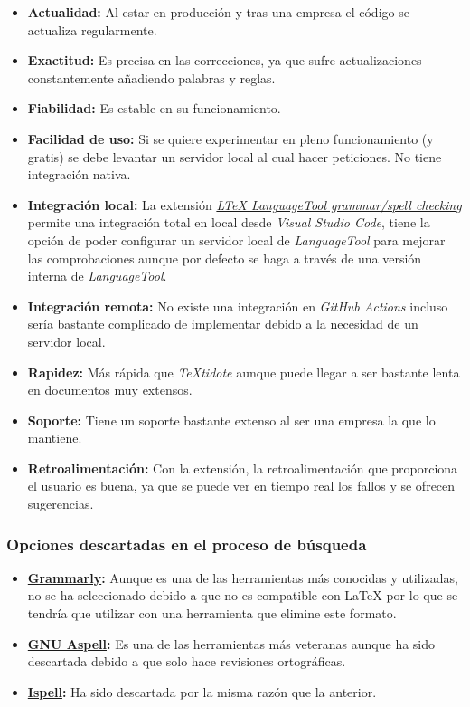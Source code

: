 \begin{itemize}
    \item[\bien] \textbf{Actualidad:}  Al estar en producción y tras una empresa el código se actualiza regularmente.
    \item[\bien] \textbf{Exactitud:} Es precisa en las correcciones, ya que sufre actualizaciones constantemente añadiendo palabras y reglas.
    \item[\bien] \textbf{Fiabilidad:} Es estable en su funcionamiento.
    \item[\regular] \textbf{Facilidad de uso:} Si se quiere experimentar en pleno funcionamiento (y gratis) se debe levantar un servidor local al cual hacer peticiones. No tiene integración nativa.
    \item[\esp] \textbf{Integración local:} La extensión \href{https://github.com/valentjn/vscode-ltex}{\textit{LTeX LanguageTool grammar/spell checking}} permite una integración total en local desde \textit{Visual Studio Code}, tiene la opción de poder configurar un servidor local de \textit{LanguageTool} para mejorar las comprobaciones aunque por defecto se haga a través de una versión interna de \textit{LanguageTool}.
    \item[\mal] \textbf{Integración remota:} No existe una integración en \textit{GitHub Actions} incluso sería bastante complicado de implementar debido a la necesidad de un servidor local.
    \item[\regular] \textbf{Rapidez:} Más rápida que \textit{TeXtidote} aunque puede llegar a ser bastante lenta en documentos muy extensos.
    \item[\bien] \textbf{Soporte:} Tiene un soporte bastante extenso al ser una empresa la que lo mantiene.
    \item[\bien] \textbf{Retroalimentación:} Con la extensión, la retroalimentación que proporciona el usuario es buena, ya que se puede ver en tiempo real los fallos y se ofrecen sugerencias.
\end{itemize}

\subsubsection{Opciones descartadas en el proceso de búsqueda}

\begin{itemize}
    \item \textbf{\href{https://www.grammarly.com/}{Grammarly}:} Aunque es una de las herramientas más conocidas y utilizadas, no se ha seleccionado debido a que no es compatible con \LaTeX{} por lo que se tendría que utilizar con una herramienta que elimine este formato.
    \item \textbf{\href{http://aspell.net/}{GNU Aspell}:} Es una de las herramientas más veteranas aunque ha sido descartada debido a que solo hace revisiones ortográficas.
    \item \textbf{\href{https://www.cs.hmc.edu/~geoff/ispell.html}{Ispell}:} Ha sido descartada por la misma razón que la anterior.
\end{itemize}

